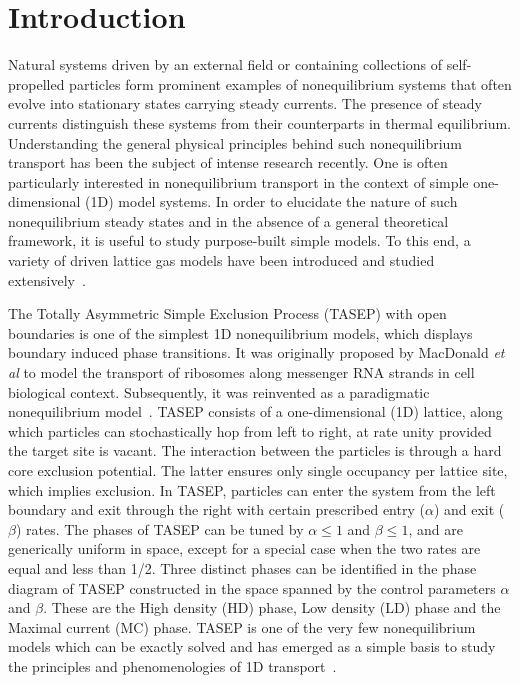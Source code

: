 \documentclass[aps,pre,twocolumn,superscriptaddress,amsmath,amssymb,longbibliography,floatfix,nofootinbib]{revtex4}
\begin{document}
\maketitle

\section{Introduction}



Natural systems driven by an external field or containing collections of self-propelled particles form prominent  examples of nonequilibrium systems that often
evolve into stationary states carrying steady currents. %
The presence of steady currents distinguish these systems  from their counterparts in thermal equilibrium.
Understanding the general physical principles behind such nonequilibrium transport has been the subject of
intense research recently. One is often particularly interested in nonequilibrium transport
in the context of simple one-dimensional (1D) model systems. In order to elucidate the nature of such nonequilibrium
steady states and in the absence of a general theoretical framework, it is useful to study purpose-built simple models. To this end, a variety of driven lattice gas models have been
introduced and studied extensively~\cite{basic}.

The Totally Asymmetric Simple Exclusion Process (TASEP) with open boundaries is one of the simplest 1D nonequilibrium models, which displays
 boundary induced phase transitions. It was originally
proposed by MacDonald {\em et al} \cite{mac}  to model
the transport of ribosomes along messenger RNA strands in cell biological context. Subsequently, it was reinvented as a paradigmatic nonequilibrium model~\cite{krug}. TASEP consists of a one-dimensional (1D) lattice, along which particles can stochastically hop
from left to right, at rate unity provided the target site is vacant.
The interaction between the particles is through a hard core exclusion potential. The latter ensures
only single occupancy per lattice site, which implies exclusion. In TASEP, particles can enter the system from the left boundary
and exit through the right with certain prescribed entry ($\alpha$) and exit ($\beta$) rates. The phases of TASEP can be tuned by
$\alpha \leq 1$ and $\beta \leq 1$, and are generically uniform in space, except for a special case when
the two rates are equal and less than 1/2. Three distinct phases can be identified in the
phase diagram of TASEP constructed in the space spanned by the control parameters $\alpha$ and $\beta$. 
These are the High density (HD) phase, Low density (LD) phase and the Maximal current (MC) phase.
 TASEP is one of the very few nonequilibrium models which
can be exactly solved and has emerged as a simple basis to study the principles and phenomenologies of 1D transport~\cite{privman,tasep-rev,phases,tasep}. 
\end{document}
